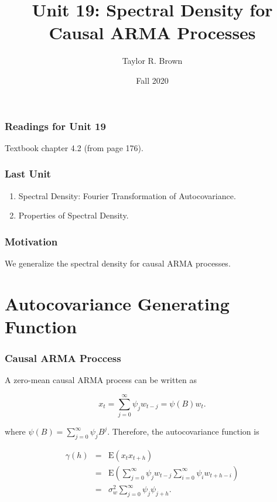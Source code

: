 \documentclass[%
xcolor=pdftex]{beamer}
\title{Unit 19: Spectral Density for Causal ARMA Processes}
\author[STAT 5170: Applied Time Series, Unit 19]{Taylor R. Brown}
\institute{Department of Statistics, University of Virginia}
\date{Fall 2020}
\begin{document}
\frame{\titlepage}

\begin{frame}
\frametitle{Readings for Unit 19}

Textbook chapter 4.2 (from page 176).

\end{frame}


\begin{frame}
\frametitle{Last Unit}
\begin{enumerate}
\item Spectral Density: Fourier Transformation of Autocovariance.
\item Properties of Spectral Density.
\end{enumerate}
\end{frame}

\begin{frame}
\frametitle{Motivation}

We generalize the spectral density for causal ARMA processes.

\end{frame}

\section{Autocovariance Generating Function}
\frame{\tableofcontents[currentsection]}

\begin{frame}
\frametitle{Causal ARMA Proccess}

A zero-mean causal ARMA process can be written as

$$
x_t = \sum_{j=0}^{\infty} \psi_j w_{t-j} = \psi(B)w_t.
$$

where $\psi(B) = \sum_{j=0}^{\infty} \psi_j B^j$. Therefore, the autocovariance function is

\begin{eqnarray*}
\gamma(h) &=& \mbox{E}(x_t x_{t+h}) \\
          &=& \mbox{E}(\sum_{j=0}^{\infty} \psi_j w_{t-j} \sum_{i=0}^{\infty} \psi_i w_{t+h-i}) \\
          &=& \sigma_w^2 \sum_{j=0}^{\infty} \psi_j \psi_{j+h}.
\end{eqnarray*}

\end{frame}

%
%
%
\end{document}
